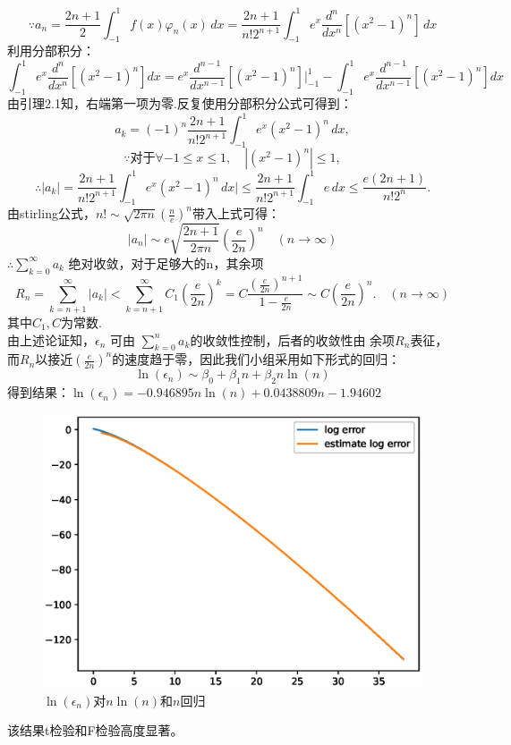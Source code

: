 \documentclass{article}
\begin{document}
    $$\because a_n=\frac{2n+1}{2}\int_{-1}^{1} f(x)\varphi_n(x)\,dx
    =\frac{2n+1}{n!2^{n+1}}\int_{-1}^{1} e^x \frac{d^n}{dx^n}[(x^2-1)^n]\,dx
    $$
    利用分部积分：
    $$\int_{-1}^{1} e^x \frac{d^n}{dx^n}[(x^2-1)^n]dx=
    e^x\frac{d^{n-1}}{dx^{n-1}}[(x^2-1)^n]|_{-1}^{1}-
    \int_{-1}^{1} e^x \frac{d^{n-1}}{dx^{n-1}}[(x^2-1)^n]dx
    $$
    由引理2.1知，右端第一项为零.反复使用分部积分公式可得到：
    $$a_k=(-1)^{n}\frac{2n+1}{n!2^{n+1}}\int_{-1}^{1} e^x(x^2-1)^n\,dx ,
    $$
    $$\because 对于\forall -1\leqslant x \leqslant 1,\quad |(x^2-1)^n|\leqslant 1,
    $$
    $$\therefore |a_k|=\frac{2n+1}{n!2^{n+1}}\int_{-1}^{1} e^x(x^2-1)^n\,dx|
    \leqslant \frac{2n+1}{n!2^{n+1}}\int_{-1}^{1}e\,dx \leqslant \frac{e(2n+1)}{n!2^n}.
    $$
    由stirling公式，$n!\sim \sqrt{2\pi n}(\frac{n}{e})^n $带入上式可得：
    $$|a_n|\sim e\sqrt{\frac{2n+1}{2\pi n}}(\frac{e}{2n})^n \quad (n\rightarrow \infty)
    $$
    $\therefore \sum_{k=0}^{\infty} a_k$ 绝对收敛，对于足够大的n，其余项
    $$R_n=\sum_{k=n+1}^{\infty} |a_k| < \sum_{k=n+1}^{\infty} C_1(\frac{e}{2n})^k
    =C\frac{(\frac{e}{2n})^{n+1}}{1-\frac{e}{2n}} \sim C(\frac{e}{2n})^n. \quad (n\rightarrow \infty)
    $$
    其中$C_1,C$为常数.\\
    由上述论证知，$\epsilon_n$ 可由 $\sum_{k=0}^{n} a_k$的收敛性控制，后者的收敛性由
    余项$R_n$表征，而$R_n$以接近$(\frac{e}{2n})^n$的速度趋于零，因此我们小组采用如下形式的回归：
    $$\ln(\epsilon_n)\sim \beta_0 +\beta_1 n +\beta_2 n\ln(n)
    $$
    得到结果：$\ln(\epsilon_n)  = -0.946895n\ln(n) +  0.0438809 n  -1.94602$
    \begin{figure}[H]
        \centering
        \includegraphics[width=16cm]{linear regression of log error to nlnn and n.eps}
        \caption{$\ln(\epsilon_n)$对$n\ln(n)$和$n$回归}
    \end{figure}
    该结果t检验和F检验高度显著。
    
\end{document}
